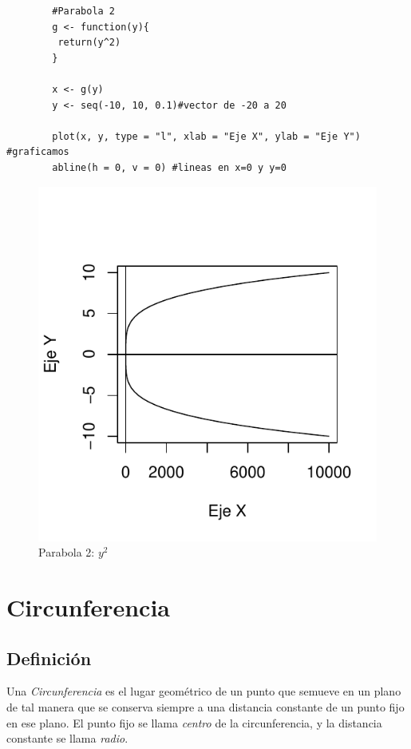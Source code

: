\documentclass[12pt,a4paper]{article}
\begin{document}
\begin{table}[htpb]
	\begin{lstlisting}
		#Parabola 2
		g <- function(y){
 		 return(y^2)
		}
		
		x <- g(y)
		y <- seq(-10, 10, 0.1)#vector de -20 a 20
		
		plot(x, y, type = "l", xlab = "Eje X", ylab = "Eje Y") #graficamos
		abline(h = 0, v = 0) #lineas en x=0 y y=0
	\end{lstlisting}
	\caption{Segundo codigo en R para gráficar la parábola de la figura \ref{fig:parabola2}.}
	\label{alg:par1}
\end{table}

\begin{figure}
\centering
\includegraphics[scale=.8]{PA2}
\caption{Parabola 2: $ y^2 $}
\label{fig:parabola2}
\end{figure}
\newpage
\section{Circunferencia} \label{sec:Circ}
\subsection{Definici\'{o}n} \label{subsec:DefC}
Una \emph{Circunferencia} es el lugar geométrico de un punto que semueve en un plano de tal manera que se conserva siempre a una distancia constante de un punto fijo en ese plano. El punto fijo se llama \emph{centro} de la circunferencia, y la distancia constante se llama \emph{radio}.\cite{geometria}\\ \\
\end{document}
